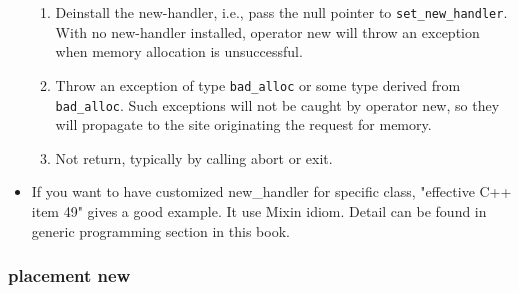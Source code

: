 \documentclass[a4paper,12pt,twoside]{book}
\begin{document}
\begin{itemize}
\begin{enumerate}
\item Deinstall the new-handler, i.e., pass the null pointer to \texttt{set\_new\_handler}. With no new-handler installed, operator new will throw an exception when memory allocation is unsuccessful.

\item Throw an exception of type \texttt{bad\_alloc} or some type derived from \texttt{bad\_alloc}. Such exceptions will not be caught by operator new, so they will propagate to the site originating the request for memory.

\item Not return, typically by calling abort or exit.
\end{enumerate}
\item If you want to have customized new\_handler for specific class, "effective C++ item 49" gives a good example. It use Mixin idiom. Detail can be found in generic programming section in this book.

\end{itemize}
\subsubsection{placement new}
\end{document}
